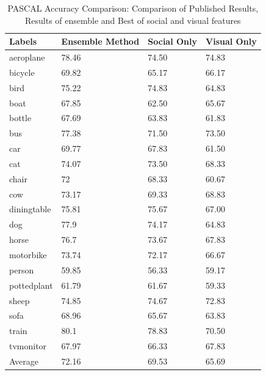 \begin{table}
\centering
\caption{ PASCAL Accuracy Comparison: Comparison of Published Results, Results of ensemble and Best of social and visual features} %
\vspace*{0.2 cm}
\begin{tabular}{| p{1.7cm}| p{1.5cm}|p{1.2cm}|p{1.2cm}|} \hline
Labels & Ensemble Method & Social Only & Visual Only  \\  [1ex] \hline
aeroplane & 78.46 & 74.50 & 74.83 \\  [1ex] \hline
bicycle & 69.82 & 65.17 & 66.17 \\  [1ex] \hline
bird & 75.22 & 74.83 & 64.83 \\  [1ex] \hline
boat & 67.85 & 62.50 & 65.67 \\  [1ex] \hline
bottle & 67.69 & 63.83 & 61.83 \\  [1ex] \hline
bus & 77.38 & 71.50 & 73.50 \\  [1ex] \hline
car & 69.77 & 67.83 & 61.50 \\  [1ex] \hline
cat & 74.07 & 73.50 & 68.33 \\  [1ex] \hline
chair & 72 & 68.33 & 60.67 \\  [1ex] \hline
cow & 73.17 & 69.33 & 68.83 \\  [1ex] \hline
diningtable & 75.81 & 75.67 & 67.00 \\  [1ex] \hline
dog & 77.9 & 74.17 & 64.83 \\  [1ex] \hline
horse & 76.7 & 73.67 & 67.83 \\  [1ex] \hline
motorbike & 73.74 & 72.17 & 66.67 \\  [1ex] \hline
person & 59.85 & 56.33 & 59.17 \\  [1ex] \hline
pottedplant & 61.79 & 61.67 & 59.33 \\  [1ex] \hline
sheep & 74.85 & 74.67 & 72.83 \\  [1ex] \hline
sofa & 68.96 & 65.67 & 63.83 \\  [1ex] \hline
train & 80.1 & 78.83 & 70.50 \\  [1ex] \hline
tvmonitor & 67.97 & 66.33 & 67.83 \\  [1ex] \hline
Average & 72.16 & 69.53 & 65.69 \\  [1ex] \hline
\end{tabular}
 \label{PASCALAccuracyOverAll} %
\end{table}




